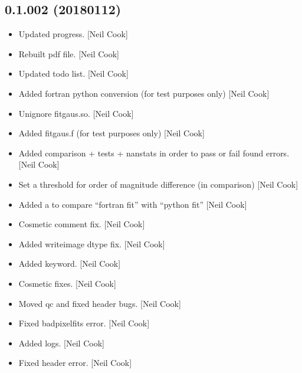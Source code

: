 \documentclass[a4paper,10pt,english]{report}
\begin{document}
\subsection{0.1.002 (2018\sphinxhyphen{}01\sphinxhyphen{}12)}
\label{\detokenize{misc/changelog:id521}}\begin{itemize}
\item {} 
Updated progress. {[}Neil Cook{]}

\item {} 
Rebuilt pdf file. {[}Neil Cook{]}

\item {} 
Updated todo list. {[}Neil Cook{]}

\item {} 
Added fortran python conversion (for test purposes only) {[}Neil Cook{]}

\item {} 
Unignore fitgaus.so. {[}Neil Cook{]}

\item {} 
Added fitgaus.f (for test purposes only) {[}Neil Cook{]}

\item {} 
Added comparison + tests + nanstats in order to pass or fail found
errors. {[}Neil Cook{]}

\item {} 
Set a threshold for order of magnitude difference (in comparison)
{[}Neil Cook{]}

\item {} 
Added a  to compare “fortran fit” with “python fit” {[}Neil
Cook{]}

\item {} 
Cosmetic comment fix. {[}Neil Cook{]}

\item {} 
Added writeimage dtype fix. {[}Neil Cook{]}

\item {} 
Added  keyword. {[}Neil Cook{]}

\item {} 
Cosmetic fixes. {[}Neil Cook{]}

\item {} 
Moved qc and fixed header bugs. {[}Neil Cook{]}

\item {} 
Fixed badpixelfits error. {[}Neil Cook{]}

\item {} 
Added logs. {[}Neil Cook{]}

\item {} 
Fixed header error. {[}Neil Cook{]}

\end{itemize}
\end{document}
